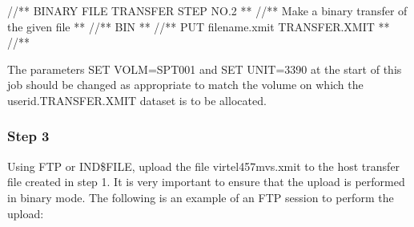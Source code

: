 \documentclass[letterpaper,10pt,english]{sphinxmanual}
\begin{document}
\begin{sphinxVerbatim}[commandchars=\\\{\}]
//*\PYGZhy{}\PYGZhy{}* BINARY FILE TRANSFER \PYGZhy{} STEP NO.2                            *\PYGZhy{}\PYGZhy{}*
//*\PYGZhy{}\PYGZhy{}* Make a binary transfer of the given file                    *\PYGZhy{}\PYGZhy{}*
//*\PYGZhy{}\PYGZhy{}* BIN                                                         *\PYGZhy{}\PYGZhy{}*
//*\PYGZhy{}\PYGZhy{}* PUT filename.xmit TRANSFER.XMIT                             *\PYGZhy{}\PYGZhy{}*
//*\PYGZhy{}\PYGZhy{}\PYGZhy{}\PYGZhy{}\PYGZhy{}\PYGZhy{}\PYGZhy{}\PYGZhy{}\PYGZhy{}\PYGZhy{}\PYGZhy{}\PYGZhy{}\PYGZhy{}\PYGZhy{}\PYGZhy{}\PYGZhy{}\PYGZhy{}\PYGZhy{}\PYGZhy{}\PYGZhy{}\PYGZhy{}\PYGZhy{}\PYGZhy{}\PYGZhy{}\PYGZhy{}\PYGZhy{}\PYGZhy{}\PYGZhy{}\PYGZhy{}\PYGZhy{}\PYGZhy{}\PYGZhy{}\PYGZhy{}\PYGZhy{}\PYGZhy{}\PYGZhy{}\PYGZhy{}\PYGZhy{}\PYGZhy{}\PYGZhy{}\PYGZhy{}\PYGZhy{}\PYGZhy{}\PYGZhy{}\PYGZhy{}\PYGZhy{}\PYGZhy{}\PYGZhy{}\PYGZhy{}\PYGZhy{}\PYGZhy{}\PYGZhy{}\PYGZhy{}\PYGZhy{}\PYGZhy{}\PYGZhy{}\PYGZhy{}\PYGZhy{}\PYGZhy{}\PYGZhy{}\PYGZhy{}\PYGZhy{}\PYGZhy{}\PYGZhy{}\PYGZhy{}\PYGZhy{}\PYGZhy{}*
\end{sphinxVerbatim}


The parameters SET VOLM=SPT001 and SET UNIT=3390 at the start of this job should be changed as appropriate to match the volume on which the userid.TRANSFER.XMIT dataset is to be allocated.


\subsubsection{Step 3}
\label{\detokenize{Installation_Guide:step-3}}
Using FTP or IND\$FILE, upload the file virtel457mvs.xmit to the host transfer file created in step 1. It is very important to ensure that the upload is performed in binary mode. The following is an example of an FTP session to perform the upload:
\end{document}
